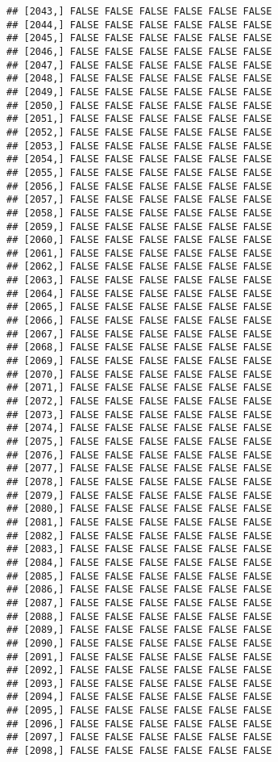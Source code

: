 \documentclass[
]{article}
\begin{document}
\begin{verbatim}
## [2043,] FALSE FALSE FALSE FALSE FALSE FALSE
## [2044,] FALSE FALSE FALSE FALSE FALSE FALSE
## [2045,] FALSE FALSE FALSE FALSE FALSE FALSE
## [2046,] FALSE FALSE FALSE FALSE FALSE FALSE
## [2047,] FALSE FALSE FALSE FALSE FALSE FALSE
## [2048,] FALSE FALSE FALSE FALSE FALSE FALSE
## [2049,] FALSE FALSE FALSE FALSE FALSE FALSE
## [2050,] FALSE FALSE FALSE FALSE FALSE FALSE
## [2051,] FALSE FALSE FALSE FALSE FALSE FALSE
## [2052,] FALSE FALSE FALSE FALSE FALSE FALSE
## [2053,] FALSE FALSE FALSE FALSE FALSE FALSE
## [2054,] FALSE FALSE FALSE FALSE FALSE FALSE
## [2055,] FALSE FALSE FALSE FALSE FALSE FALSE
## [2056,] FALSE FALSE FALSE FALSE FALSE FALSE
## [2057,] FALSE FALSE FALSE FALSE FALSE FALSE
## [2058,] FALSE FALSE FALSE FALSE FALSE FALSE
## [2059,] FALSE FALSE FALSE FALSE FALSE FALSE
## [2060,] FALSE FALSE FALSE FALSE FALSE FALSE
## [2061,] FALSE FALSE FALSE FALSE FALSE FALSE
## [2062,] FALSE FALSE FALSE FALSE FALSE FALSE
## [2063,] FALSE FALSE FALSE FALSE FALSE FALSE
## [2064,] FALSE FALSE FALSE FALSE FALSE FALSE
## [2065,] FALSE FALSE FALSE FALSE FALSE FALSE
## [2066,] FALSE FALSE FALSE FALSE FALSE FALSE
## [2067,] FALSE FALSE FALSE FALSE FALSE FALSE
## [2068,] FALSE FALSE FALSE FALSE FALSE FALSE
## [2069,] FALSE FALSE FALSE FALSE FALSE FALSE
## [2070,] FALSE FALSE FALSE FALSE FALSE FALSE
## [2071,] FALSE FALSE FALSE FALSE FALSE FALSE
## [2072,] FALSE FALSE FALSE FALSE FALSE FALSE
## [2073,] FALSE FALSE FALSE FALSE FALSE FALSE
## [2074,] FALSE FALSE FALSE FALSE FALSE FALSE
## [2075,] FALSE FALSE FALSE FALSE FALSE FALSE
## [2076,] FALSE FALSE FALSE FALSE FALSE FALSE
## [2077,] FALSE FALSE FALSE FALSE FALSE FALSE
## [2078,] FALSE FALSE FALSE FALSE FALSE FALSE
## [2079,] FALSE FALSE FALSE FALSE FALSE FALSE
## [2080,] FALSE FALSE FALSE FALSE FALSE FALSE
## [2081,] FALSE FALSE FALSE FALSE FALSE FALSE
## [2082,] FALSE FALSE FALSE FALSE FALSE FALSE
## [2083,] FALSE FALSE FALSE FALSE FALSE FALSE
## [2084,] FALSE FALSE FALSE FALSE FALSE FALSE
## [2085,] FALSE FALSE FALSE FALSE FALSE FALSE
## [2086,] FALSE FALSE FALSE FALSE FALSE FALSE
## [2087,] FALSE FALSE FALSE FALSE FALSE FALSE
## [2088,] FALSE FALSE FALSE FALSE FALSE FALSE
## [2089,] FALSE FALSE FALSE FALSE FALSE FALSE
## [2090,] FALSE FALSE FALSE FALSE FALSE FALSE
## [2091,] FALSE FALSE FALSE FALSE FALSE FALSE
## [2092,] FALSE FALSE FALSE FALSE FALSE FALSE
## [2093,] FALSE FALSE FALSE FALSE FALSE FALSE
## [2094,] FALSE FALSE FALSE FALSE FALSE FALSE
## [2095,] FALSE FALSE FALSE FALSE FALSE FALSE
## [2096,] FALSE FALSE FALSE FALSE FALSE FALSE
## [2097,] FALSE FALSE FALSE FALSE FALSE FALSE
## [2098,] FALSE FALSE FALSE FALSE FALSE FALSE

\end{verbatim}
\end{document}
